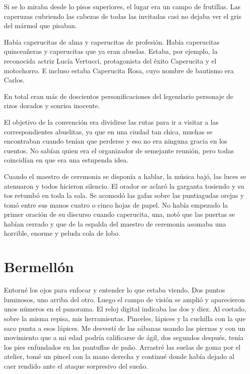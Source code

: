\documentclass[11pt,twoside,openright,a6paper]{book}
\begin{document}
Si se lo miraba desde lo pisos superiores, el lugar era un campo de frutillas. Las caperuzas cubriendo las cabezas de todas las invitadas casi no dejaba ver el gris del mármol que pisaban.

Había caperucitas de alma y caperucitas de profesión. Había caperucitas quinceañeras y caperucitas que ya eran abuelas.
Estaba, por ejemplo, la reconocida actriz Lucía Vertucci, protagonista del éxito Caperucita y el motochorro. E incluso estaba Caperucita Rosa, cuyo nombre de bautismo era Carlos.

En total eran más de doscientos personificaciones del legendario personaje de rizos dorados y sonrisa inocente.

El objetivo de la convención era dividirse las rutas para ir a visitar a las correspondientes abuelitas, ya que en una ciudad tan chica, muchas se encontraban cuando tenían que perderse y eso no era ninguna gracia en los cuentos. No sabían quien era el organizador de semejante reunión, pero todas coincidían en que era una estupenda idea.

Cuando el maestro de ceremonia se disponía a hablar, la música bajó, las luces se atenuaron y todos hicieron silencio. El orador se aclaró la garganta tosiendo y su tos retumbó en toda la sala. Se acomodó las gafas sobre las puntiagudas orejas y tomó entre sus manos cuatro o cinco hojas de papel. No había empezado la primer oración de su discurso cuando caperucita, una, notó que las puertas se habían cerrado y que de la espalda del maestro de ceremonia asomaba una horrible, enorme y peluda cola de lobo.

\chapter*{Bermellón}

Entorné los ojos para enfocar y entender lo que estaba viendo. Dos puntos luminosos, uno arriba del otro. Luego el campo de visión se amplió y aparecieron unos números en el panorama. El reloj digital indicaba las dos y diez. Al costado, sobre la misma repisa, mis herramientas. Pinceles, lápices y la cuchilla con la que saco punta a esos lápices. Me desvestí de las sábanas usando las piernas y con un movimiento que a mi edad podría calificarse de ágil, dos segundos después, tenía los pies enfundados en las pantuflas de paño. Arrastré las suelas de goma por el atelier, tomé un pincel con la mano derecha y continué donde había dejado al caer rendido ante el ataque sorpresivo del sueño.
\end{document}
